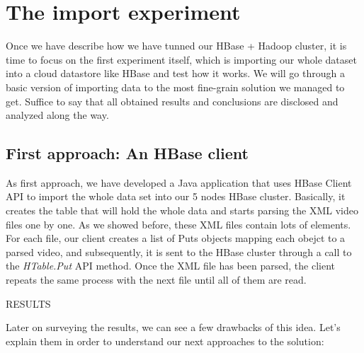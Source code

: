 \section{The import experiment}

Once we have describe how we have tunned our HBase + Hadoop cluster, it is time to focus on the first experiment itself, which is importing our whole dataset into a cloud datastore like HBase and test how it works. We will go through a basic version of importing data to the most fine-grain solution we managed to get. Suffice to say that all obtained results and conclusions are disclosed and analyzed along the way.

\subsection{First approach: An HBase client}

As first approach, we have developed a Java application that uses HBase Client API to import the whole data set into our 5 nodes HBase cluster. Basically, it creates the table that will hold the whole data and starts parsing the XML video files one by one. As we showed before, these XML files contain lots of elements. For each file, our client creates a list of Puts objects mapping each obejct to a parsed video, and subsequently, it is sent to the HBase cluster through a call to the \textit{HTable.Put} API method. Once the XML file has been parsed, the client repeats the same process with the next file until all of them are read.
\bigskip
\centerline{RESULTS}
\bigskip

Later on surveying the results, we can see a few drawbacks of this idea. Let's explain them in order to understand our next approaches to the solution:

